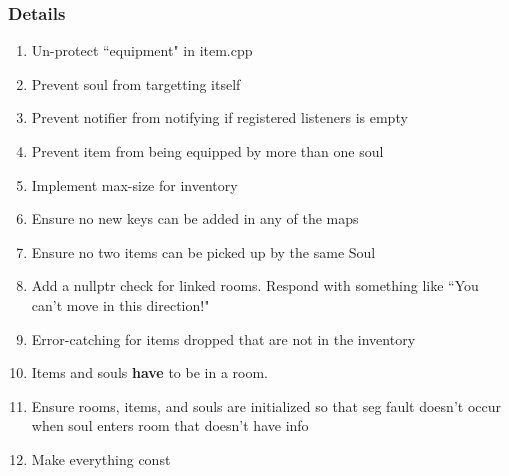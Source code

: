 \documentclass{article}
\begin{document}
\subsubsection*{Details}
\begin{enumerate}
    \item Un-protect ``equipment" in item.cpp
    \item Prevent soul from targetting itself
    \item Prevent notifier from notifying if registered listeners is empty
    \item Prevent item from being equipped by more than one soul
    \item Implement max-size for inventory
    \item Ensure no new keys can be added in any of the maps
    \item Ensure no two items can be picked up by the same Soul
    \item Add a nullptr check for linked rooms. Respond with something
        like ``You can't move in this direction!" \checkmark
    \item Error-catching for items dropped that are not in the inventory
    \item Items and souls \textbf{have} to be in a room. \checkmark
    \item Ensure rooms, items, and souls are initialized so that seg
        fault doesn't occur when soul enters room that doesn't have
        info
    \item Make everything const
\end{enumerate}
\end{document}
